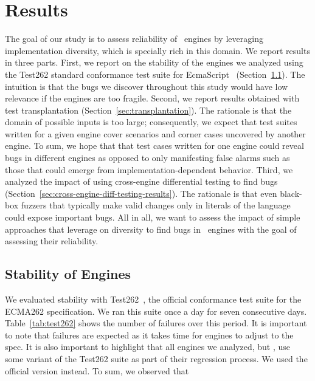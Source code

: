 \documentclass[10pt,conference,anonymous]{IEEEtran}
\begin{document}

\section{Results}
\label{sec:results}

The goal of our study is to assess reliability of \js\ engines by
leveraging implementation diversity, which is specially rich in this
domain. We report results in three parts. First, we report on the
stability of the engines we analyzed using the Test262 standard
conformance test suite for EcmaScript~\cite{ecma262-conformance-suite}
(Section~\ref{sec:stability}). The intuition is that the bugs we
discover throughout this study would have low relevance if the engines
are too fragile. Second, we report results obtained with test
transplantation (Section~\ref{sec:transplantation}). The rationale is
that the domain of possible inputs is too large; consequently, we
expect that test suites written for a given engine cover scenarios and
corner cases uncovered by another engine. To sum, we hope that that
test cases written for one engine could reveal bugs in different
engines as opposed to only manifesting false alarms such as those that
could emerge from implementation-dependent behavior. Third, we
analyzed the impact of using cross-engine differential testing to find
bugs (Section~\ref{sec:cross-engine-diff-testing-results}). The
rationale is that even black-box fuzzers that typically make valid
changes only in literals of the language could expose important
bugs. All in all, we want to assess the impact of simple approaches
that leverage on diversity to find bugs in \js\ engines with the goal
of assessing their reliability.

\subsection{Stability of Engines}
\label{sec:stability}

We evaluated stability with Test262~\cite{ecma262-conformance-suite},
the official \js{} conformance test suite for the ECMA262
specification. We ran this suite once a day for seven consecutive
days. Table~\ref{tab:test262} shows the number of failures over this
period. It is important to note that failures are expected as it takes
time for engines to adjust to the spec. It is also important to
highlight that all engines we analyzed, but \chakra{}, use some
variant of the Test262 suite as part of their regression
process. We used the official version
instead. To sum, we observed
that  
\end{document}
